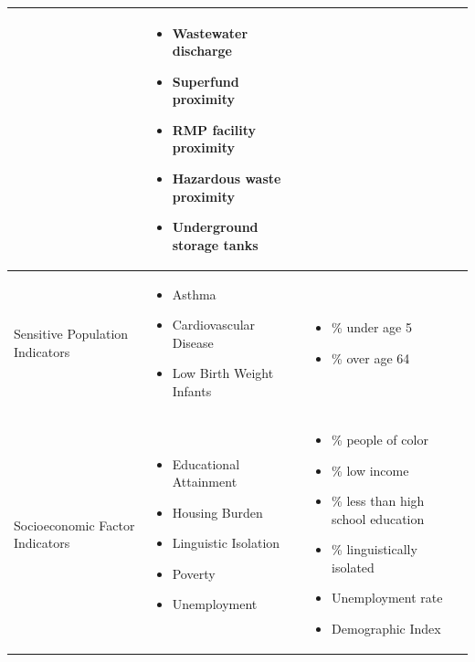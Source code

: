 \begin{table}
\begin{tabular}{L{0.2\textwidth} L{0.35\textwidth} L{0.35\textwidth}}
\begin{itemize}[noitemsep, topsep=0pt]
        \end{itemize} &
        \begin{itemize}[noitemsep, topsep=0pt]
            \item Wastewater discharge
            \item Superfund proximity
            \item RMP facility proximity
            \item Hazardous waste proximity
            \item Underground storage tanks
        \end{itemize} \\
        \hline
        Sensitive Population Indicators & 
        \begin{itemize}[noitemsep, topsep=0pt]
            \item Asthma
            \item Cardiovascular Disease
            \item Low Birth Weight Infants
        \end{itemize} & 
        \begin{itemize}[noitemsep, topsep=0pt]
            \item \% under age 5
            \item \% over age 64
        \end{itemize} \\
        \hline 
        Socioeconomic Factor Indicators & 
        \begin{itemize}[noitemsep, topsep=0pt]
            \item Educational Attainment
            \item Housing Burden
            \item Linguistic Isolation
            \item Poverty
            \item Unemployment
        \end{itemize} & 
        \begin{itemize}[noitemsep, topsep=0pt]
            \item \% people of color
            \item \% low income
            \item \% less than high school education
            \item \% linguistically isolated
            \item Unemployment rate
            \item Demographic Index
        \end{itemize} \\
        \hline
    \end{tabular}
    \vspace{1em}
\end{table}

